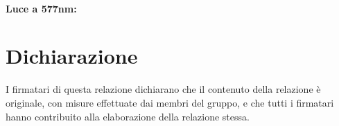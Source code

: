 \documentclass[10pt,a4paper]{article}
\begin{document}
\paragraph{Luce a 577nm:\hspace{2.5cm}}



\section*{Dichiarazione}
I firmatari di questa relazione dichiarano che il contenuto della relazione \`e originale, con misure effettuate dai membri del gruppo, e che tutti i firmatari hanno contribuito alla elaborazione della relazione stessa.
\end{document}
